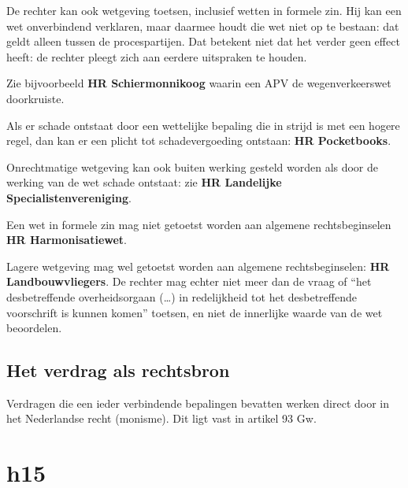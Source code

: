 \documentclass{article}
\begin{document}
De rechter kan ook wetgeving toetsen, inclusief wetten in formele zin. Hij kan
een wet onverbindend verklaren, maar daarmee houdt die wet niet op te bestaan:
dat geldt alleen tussen de procespartijen. Dat betekent niet dat het verder
geen effect heeft: de rechter pleegt zich aan eerdere uitspraken te houden. 

Zie bijvoorbeeld \textbf{HR Schiermonnikoog} waarin een APV de wegenverkeerswet
doorkruiste.

Als er schade ontstaat door een wettelijke bepaling die in strijd is met een
hogere regel, dan kan er een plicht tot schadevergoeding ontstaan: \textbf{HR
Pocketbooks}.

Onrechtmatige wetgeving kan ook buiten werking gesteld worden als door de
werking van de wet schade ontstaat: zie \textbf{HR Landelijke
Specialistenvereniging}.

Een wet in formele zin mag niet getoetst worden aan algemene rechtsbeginselen
\textbf{HR Harmonisatiewet}.

Lagere wetgeving mag wel getoetst worden aan algemene rechtsbeginselen:
\textbf{HR Landbouwvliegers}. De rechter mag echter niet meer dan de vraag of
``het desbetreffende overheidsorgaan (\ldots) in redelijkheid tot het
desbetreffende voorschrift is kunnen komen'' toetsen, en niet de innerlijke
waarde van de wet beoordelen.

\subsection{Het verdrag als rechtsbron}

Verdragen die een ieder verbindende bepalingen bevatten werken direct
door in het Nederlandse recht (monisme). Dit ligt vast in artikel 93 Gw.

\section{h15} \label{h15}
\end{document}
